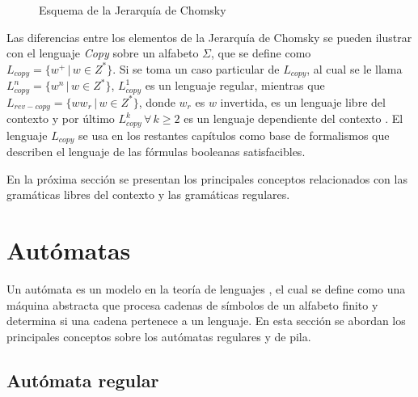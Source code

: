 \begin{figure}
      \centering
      \caption{Esquema de la Jerarquía de Chomsky}
      \label{fig:ChomskySchema} %
\end{figure}

Las diferencias entre los elementos de la Jerarquía de Chomsky se pueden ilustrar con el lenguaje \textit{Copy}
sobre un alfabeto $\Sigma$, que se define como $L_{copy}=\{w^+\,|\,w\in Z^*\}$.  Si se toma un caso particular 
de $L_{copy}$, al cual se le llama $L_{copy}^n=\{w^n\,|\,w\in Z^*\}$, $L_{copy}^1$ es un lenguaje regular, 
mientras que $L_{rev-copy}=\{ww_r\,|\,w\in Z^*\}$, donde $w_r$ es $w$ invertida, es un lenguaje libre del contexto y por último $L_{copy}^k\,\forall\,k\geq 2$ es un lenguaje dependiente del contexto \cite{authomataTheory}. 
El lenguaje $L_{copy}$ se usa en los restantes capítulos como base de formalismos que describen el lenguaje de las fórmulas booleanas satisfacibles.

En la próxima sección se presentan los principales conceptos relacionados con las gramáticas libres del contexto y las 
gramáticas regulares. 

\section{Autómatas}
Un autómata es un modelo en la teoría de lenguajes \cite{authomataTheory}, el cual se define como una máquina 
abstracta que procesa cadenas de símbolos de un alfabeto finito y determina si una cadena pertenece a un lenguaje. 
En esta sección se abordan los principales conceptos sobre los autómatas regulares y de pila.
\subsection{Autómata regular}

